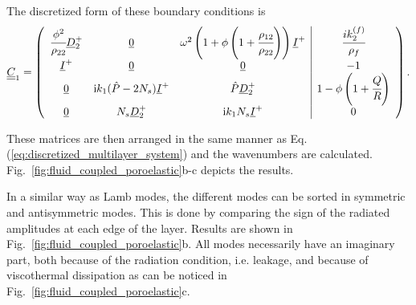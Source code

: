   The discretized form of these boundary conditions is
    \begin{equation}
        \underline{\underline{C}}_{1} = \left(
            \begin{array}{ccc|c}
                \cfrac{\phi^2}{ \rho_{22}} \underline{D}_2^+ & \underline{0} & \omega^2 \left(1 + \phi \left( 1 + \cfrac{ \rho_{12}}{ \rho_{22}}\right) \right) \underline{I}^+ & \cfrac{ik_2^{(f)}}{\rho_f}  \\
                \underline{I}^+ & \underline{0} & \underline{0} & -1 \\
                \underline{0} & \mathrm i  k_1 (\hat P - 2 N_s) \underline{I}^+ & \hat P \underline{D}_2^+ & 1 - \phi \left(1+ \cfrac{ Q} { R}\right) \\
                \underline{0} &  N_s \underline{D}_2^+ & \mathrm i  k_1  N_s \underline{I}^+ & 0 \\
            \end{array} \right).
            \label{eq:fluid_poro_coupling_top}
        \end{equation}
        
    
    These matrices are then arranged in the same manner as Eq.(\ref{eq:discretized_multilayer_system}) and the wavenumbers are calculated. Fig.~\ref{fig:fluid_coupled_poroelastic}b-c depicts the results. 
    
 In a similar way as Lamb modes, the different modes can be sorted in symmetric and antisymmetric modes. This is done by comparing the sign of the radiated amplitudes at each edge of the layer. Results are shown in Fig.~\ref{fig:fluid_coupled_poroelastic}b. All modes necessarily have an imaginary part, both because of the radiation condition, i.e. leakage, and because of viscothermal dissipation as can be noticed in Fig.~\ref{fig:fluid_coupled_poroelastic}c.
 


